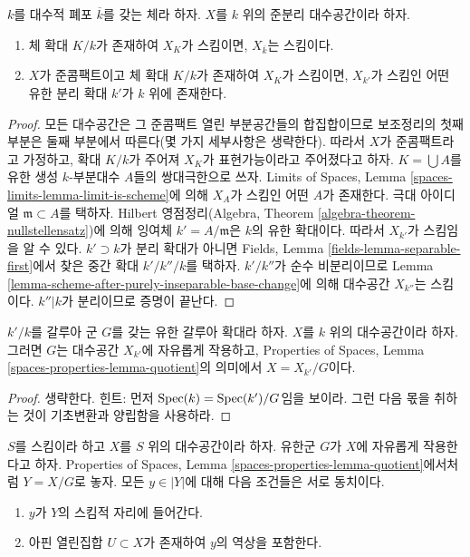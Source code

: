 \begin{lemma}
\label{lemma-when-scheme-after-base-change}
$k$를 대수적 폐포 $\overline{k}$를 갖는 체라 하자. $X$를 $k$ 위의
준분리 대수공간이라 하자.
\begin{enumerate}
\item 체 확대 $K/k$가 존재하여 $X_K$가 스킴이면,
$X_{\overline{k}}$는 스킴이다.
\item $X$가 준콤팩트이고 체 확대 $K/k$가 존재하여 $X_K$가 스킴이면,
$X_{k'}$가 스킴인 어떤 유한 분리 확대 $k'$가 $k$ 위에 존재한다.
\end{enumerate}
\end{lemma}

\begin{proof}
모든 대수공간은 그 준콤팩트 열린 부분공간들의 합집합이므로 보조정리의
첫째 부분은 둘째 부분에서 따른다(몇 가지 세부사항은 생략한다). 따라서
$X$가 준콤팩트라고 가정하고, 확대 $K/k$가 주어져 $X_K$가 표현가능이라고
주어졌다고 하자. $K = \bigcup A$를 유한 생성 $k$-부분대수 $A$들의
쌍대극한으로 쓰자. Limits of Spaces, Lemma
\ref{spaces-limits-lemma-limit-is-scheme}에 의해 $X_A$가 스킴인 어떤
$A$가 존재한다. 극대 아이디얼 $\mathfrak m \subset A$를 택하자.
Hilbert 영점정리(Algebra, Theorem
\ref{algebra-theorem-nullstellensatz})에 의해 잉여체
$k' = A/\mathfrak m$은 $k$의 유한 확대이다. 따라서 $X_{k'}$가
스킴임을 알 수 있다. $k' \supset k$가 분리 확대가 아니면 Fields,
Lemma \ref{fields-lemma-separable-first}에서 찾은 중간 확대
$k'/k''/k$를 택하자. $k'/k''$가 순수 비분리이므로 Lemma
\ref{lemma-scheme-after-purely-inseparable-base-change}에 의해 대수공간
$X_{k''}$는 스킴이다. $k''|k$가 분리이므로 증명이 끝난다.
\end{proof}

\begin{lemma}
\label{lemma-base-change-by-Galois}
$k'/k$를 갈루아 군 $G$를 갖는 유한 갈루아 확대라 하자. $X$를 $k$
위의 대수공간이라 하자. 그러면 $G$는 대수공간 $X_{k'}$에 자유롭게
작용하고, Properties of Spaces, Lemma
\ref{spaces-properties-lemma-quotient}의 의미에서
$X = X_{k'}/G$이다.
\end{lemma}

\begin{proof}
생략한다. 힌트: 먼저 $\mathop{\mathrm{Spec}}(k) = \mathop{\mathrm{Spec}}(k')/G$임을 보이라. 그런 다음
몫을 취하는 것이 기초변환과 양립함을 사용하라.
\end{proof}

\begin{lemma}
\label{lemma-when-quotient-scheme-at-point}
$S$를 스킴이라 하고 $X$를 $S$ 위의 대수공간이라 하자. 유한군 $G$가
$X$에 자유롭게 작용한다고 하자. Properties of Spaces, Lemma
\ref{spaces-properties-lemma-quotient}에서처럼 $Y = X/G$로 놓자. 모든
$y \in |Y|$에 대해 다음 조건들은 서로 동치이다.
\begin{enumerate}
\item $y$가 $Y$의 스킴적 자리에 들어간다.
\item 아핀 열린집합 $U \subset X$가 존재하여 $y$의 역상을 포함한다.
\end{enumerate}
\end{lemma}

